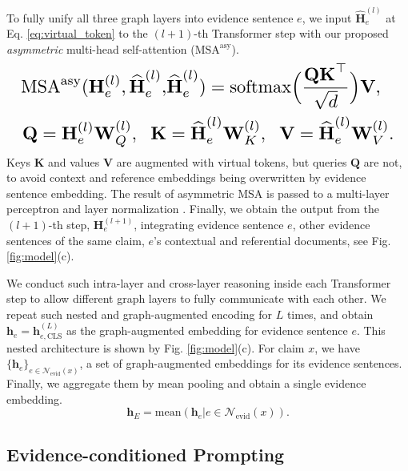 To fully unify all three graph layers into evidence sentence $ e $, we input $ \widehat{\textbf{H}}_e^{(l)} $ at Eq. \ref{eq:virtual_token} to the $ (l+1) $-th Transformer step with our proposed \emph{asymmetric} multi-head self-attention ($ \text{MSA}^{\text{asy}} $).
\begin{equation}
\label{eq:asymmetric_attention}
\resizebox{\columnwidth}{!}{
$ \begin{split}
    \text{MSA}^{\text{asy}}(\textbf{H}_e^{(l)},\widehat{\textbf{H}}_e^{(l)},&\widehat{\textbf{H}}_e^{(l)})=\text{softmax}\Big(\dfrac{\textbf{Q}\textbf{K}^\top}{\sqrt{d}}\Big)\textbf{V},\\
    \textbf{Q}=\textbf{H}_e^{(l)}\textbf{W}_{Q}^{(l)},\;\  \textbf{K}&=\widehat{\textbf{H}}_e^{(l)}\textbf{W}_{K}^{(l)},\;\  \textbf{V}=\widehat{\textbf{H}}_e^{(l)}\textbf{W}_{V}^{(l)}.
\end{split} $
}
\end{equation}
Keys $ \textbf{K} $ and values $ \textbf{V} $ are augmented with virtual tokens, but queries $ \textbf{Q} $ are not, to avoid context and reference embeddings being overwritten by evidence sentence embedding. The result of asymmetric MSA is passed to a multi-layer perceptron and layer normalization \cite{transformer}. Finally, we obtain the output from the $ (l+1) $-th step, $ \textbf{H}_e^{(l+1)} $, integrating evidence sentence $ e $, other evidence sentences of the same claim, $ e $'s contextual and referential documents, see Fig. \ref{fig:model}(c).

We conduct such intra-layer and cross-layer reasoning inside each Transformer step to allow different graph layers to fully communicate with each other. We repeat such nested and graph-augmented encoding for $ L $ times, and obtain $ \textbf{h}_e=\textbf{h}_{e,\text{CLS}}^{(L)} $ as the graph-augmented embedding for evidence sentence $ e $. This nested architecture is shown by Fig. \ref{fig:model}(c). For claim $ x $, we have $ \{\textbf{h}_e\}_{e\in\mathcal{N}_{\text{evid}}(x)} $, a set of graph-augmented embeddings for its evidence sentences. Finally, we aggregate them by mean pooling and obtain a single evidence embedding.
\begin{equation}
\label{eq:evidence_embedding}
    \textbf{h}_E=\text{mean}(\textbf{h}_e|e\in\mathcal{N}_{\text{evid}}(x)).
\end{equation}

\subsection{Evidence-conditioned Prompting}

